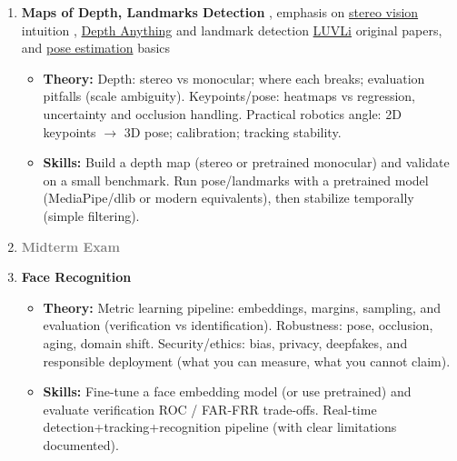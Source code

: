 \documentclass[a4paper,11pt]{texMemo}
\begin{document}
\begin{enumerate}
\item \textbf{Maps of Depth, Landmarks Detection}
\citep{YandexHandbookML, prince2023understanding, ming2021deep, kumar2020luvli}, emphasis on \href{https://huggingface.co/learn/computer-vision-course/en/unit8/3d_measurements_stereo_vision}{stereo vision} intuition \citep{HuggingFaceCVcourse}, \href{https://arxiv.org/abs/2406.09414}{Depth Anything} \citep{yang2024depthv2} and landmark detection \href{https://arxiv.org/abs/2004.02980}{LUVLi} \citep{kumar2020luvli} original papers, and \href{https://udlbook.github.io/udlbook/}{pose estimation} basics \citep{prince2023understanding}
\begin{itemize}
    \item \textbf{Theory:}
    Depth: stereo vs monocular; where each breaks; evaluation pitfalls (scale ambiguity).
    Keypoints/pose: heatmaps vs regression, uncertainty and occlusion handling.
    Practical robotics angle: 2D keypoints $\rightarrow$ 3D pose; calibration; tracking stability.
    \item \textbf{Skills:}
    Build a depth map (stereo or pretrained monocular) and validate on a small benchmark.
    Run pose/landmarks with a pretrained model (MediaPipe/dlib or modern equivalents), then stabilize temporally (simple filtering).
\end{itemize}

\item \textcolor{gray}{\textbf{Midterm Exam}}

\item \textbf{Face Recognition}
\citep{zeng2021survey, liu2023patch, turk1991eigenfaces, koch2015siamese, schroff2015facenet, deng2019arcface, wang2021deep, prince2023understanding}
\begin{itemize}
    \item \textbf{Theory:}
    Metric learning pipeline: embeddings, margins, sampling, and evaluation (verification vs identification).
    Robustness: pose, occlusion, aging, domain shift.
    Security/ethics: bias, privacy, deepfakes, and responsible deployment (what you can measure, what you cannot claim).
    \item \textbf{Skills:}
    Fine-tune a face embedding model (or use pretrained) and evaluate verification ROC / FAR-FRR trade-offs.
    Real-time detection+tracking+recognition pipeline (with clear limitations documented).
\end{itemize}



\end{enumerate}
\end{document}
